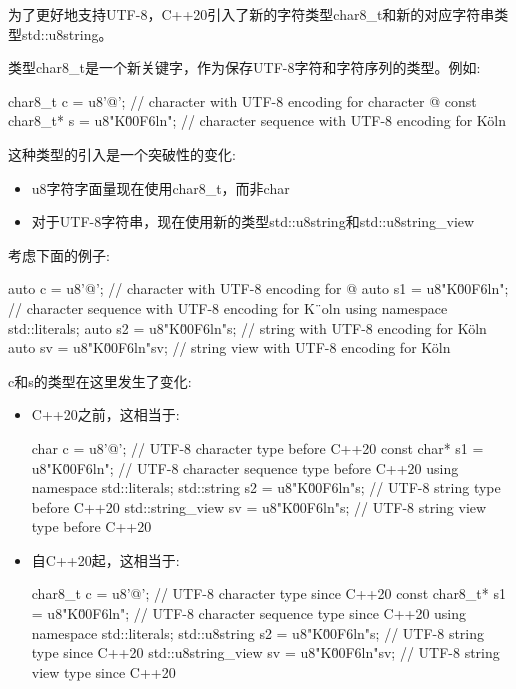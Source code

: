 
为了更好地支持UTF-8，C++20引入了新的字符类型char8\_t和新的对应字符串类型std::u8string。

类型char8\_t是一个新关键字，作为保存UTF-8字符和字符序列的类型。例如:

\begin{cpp}
char8_t c = u8'@'; // character with UTF-8 encoding for character @
const char8_t* s = u8"K\u00F6ln"; // character sequence with UTF-8 encoding for Köln
\end{cpp}

这种类型的引入是一个突破性的变化:

\begin{itemize}
\item
u8字符字面量现在使用char8\_t，而非char

\item
对于UTF-8字符串，现在使用新的类型std::u8string和std::u8string\_view
\end{itemize}

考虑下面的例子:

\begin{cpp}
auto c = u8'@'; // character with UTF-8 encoding for @
auto s1 = u8"K\u00F6ln"; // character sequence with UTF-8 encoding for K¨oln
using namespace std::literals;
auto s2 = u8"K\u00F6ln"s; // string with UTF-8 encoding for Köln
auto sv = u8"K\u00F6ln"sv; // string view with UTF-8 encoding for Köln
\end{cpp}

c和s的类型在这里发生了变化:

\begin{itemize}
\item
C++20之前，这相当于:

\begin{cpp}
char c = u8'@'; // UTF-8 character type before C++20
const char* s1 = u8"K\u00F6ln"; // UTF-8 character sequence type before C++20
using namespace std::literals;
std::string s2 = u8"K\u00F6ln"s; // UTF-8 string type before C++20
std::string_view sv = u8"K\u00F6ln"s; // UTF-8 string view type before C++20
\end{cpp}

\item
自C++20起，这相当于:

\begin{cpp}
char8_t c = u8'@'; // UTF-8 character type since C++20
const char8_t* s1 = u8"K\u00F6ln"; // UTF-8 character sequence type since C++20
using namespace std::literals;
std::u8string s2 = u8"K\u00F6ln"s; // UTF-8 string type since C++20
std::u8string_view sv = u8"K\u00F6ln"sv; // UTF-8 string view type since C++20
\end{cpp}

\end{itemize}

